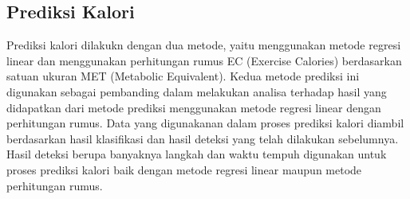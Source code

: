 \subsection{Prediksi Kalori}
\label{subsec:PrediksiKalori}

Prediksi kalori dilakukn dengan dua metode, yaitu menggunakan metode regresi linear dan menggunakan perhitungan rumus EC (Exercise Calories) berdasarkan satuan ukuran MET (Metabolic Equivalent). Kedua metode prediksi ini digunakan sebagai pembanding dalam melakukan analisa terhadap hasil yang didapatkan dari metode prediksi menggunakan metode regresi linear dengan perhitungan rumus. Data yang digunakanan dalam proses prediksi kalori diambil berdasarkan hasil klasifikasi dan hasil deteksi yang telah dilakukan sebelumnya. Hasil deteksi berupa banyaknya langkah dan waktu tempuh digunakan untuk proses prediksi kalori baik dengan metode regresi linear maupun metode perhitungan rumus.

